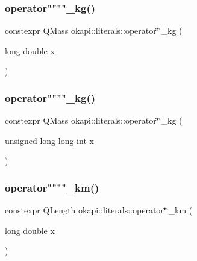 \mbox{\label{namespaceokapi_1_1literals_a64be793bec350dc02ca149670dfa3942}} 
\subsubsection{\texorpdfstring{operator""""\_kg()}{operator""\_kg()}\hspace{0.1cm}{\footnotesize\ttfamily [1/2]}}
{\footnotesize\ttfamily constexpr Q\+Mass okapi\+::literals\+::operator\char`\"{}\char`\"{}\+\_\+kg (\begin{DoxyParamCaption}\item[{long double}]{x }\end{DoxyParamCaption})}

\mbox{\label{namespaceokapi_1_1literals_aeeac66a4f9103ec59f750da7f8c17286}} 
\subsubsection{\texorpdfstring{operator""""\_kg()}{operator""\_kg()}\hspace{0.1cm}{\footnotesize\ttfamily [2/2]}}
{\footnotesize\ttfamily constexpr Q\+Mass okapi\+::literals\+::operator\char`\"{}\char`\"{}\+\_\+kg (\begin{DoxyParamCaption}\item[{unsigned long long int}]{x }\end{DoxyParamCaption})}

\mbox{\label{namespaceokapi_1_1literals_a32c66d1c5e1e1c23bd588e68ae430ecd}} 
\subsubsection{\texorpdfstring{operator""""\_km()}{operator""\_km()}\hspace{0.1cm}{\footnotesize\ttfamily [1/2]}}
{\footnotesize\ttfamily constexpr Q\+Length okapi\+::literals\+::operator\char`\"{}\char`\"{}\+\_\+km (\begin{DoxyParamCaption}\item[{long double}]{x }\end{DoxyParamCaption})}

